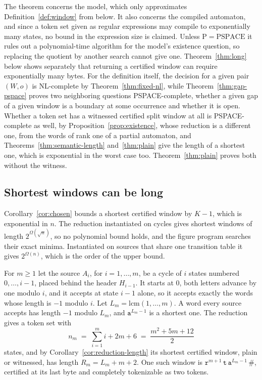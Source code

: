 \documentclass[11pt,a4paper]{article}
\theoremstyle{definition}
\theoremstyle{plain}
\newcommand{\code}[1]{\texttt{#1}}
\begin{document}
The theorem concerns the model, which only approximates Definition~\ref{def:window} from below. It also concerns the
compiled automaton, and since a token set given as regular expressions may compile to exponentially many states, no
bound in the expression size is claimed. Unless $\mathrm{P} = \mathrm{PSPACE}$ it rules out a polynomial-time algorithm
for the model's existence question, so replacing the quotient by another search cannot give one. Theorem~\ref{thm:long}
below shows separately that returning a certified window can require exponentially many bytes. For the definition
itself, the decision for a given pair $(W, o)$ is NL-complete by Theorem~\ref{thm:fixed-nl}, while
Theorem~\ref{thm:gap-pspace} proves two neighboring questions PSPACE-complete, whether a given gap of a given window is
a boundary at some occurrence and whether it is open. Whether a token set has a witnessed certified split window at all
is PSPACE-complete as well, by Proposition~\ref{prop:existence}, whose reduction is a different one, from the words of
rank one of a partial automaton, and Theorems~\ref{thm:semantic-length} and~\ref{thm:plain} give the length of a
shortest one, which is exponential in the worst case too. Theorem~\ref{thm:plain} proves both without the witness.

\subsection{Shortest windows can be long}
\label{sec:long}

Corollary~\ref{cor:chosen} bounds a shortest certified window by $K - 1$, which is exponential in $n$. The reduction
instantiated on cycles gives shortest windows of length $2^{\Omega(\sqrt n)}$, so no polynomial bound holds, and the
figure program searches their exact minima. Instantiated on sources that share one transition table it gives
$2^{\Omega(n)}$, which is the order of the upper bound.

For $m \geq 1$ let the source $A_i$, for $i = 1, \ldots, m$, be a cycle of $i$ states numbered $0, \ldots, i - 1$,
placed behind the header $H_{i-1}$. It starts at $0$, both letters advance by one modulo $i$, and it accepts at state
$i - 1$ alone, so it accepts exactly the words whose length is $-1$ modulo $i$. Let $L_m = \mathrm{lcm}(1, \ldots, m)$.
A word every source accepts has length $-1$ modulo $L_m$, and $\code{a}^{L_m - 1}$ is a shortest one. The reduction
gives a token set with
\[ n_m \;=\; \sum_{i=1}^{m} i + 2m + 6 \;=\; \frac{m^2 + 5m + 12}{2} \]
states, and by Corollary~\ref{cor:reduction-length} its shortest certified window, plain or witnessed, has length
$R_m = L_m + m + 2$. One such window is $\code{r}^{m+1}\, \code{t}\, \code{a}^{L_m - 1}\, \code{\#}$, certified at its
last byte and completely tokenizable as two tokens.
\end{document}
